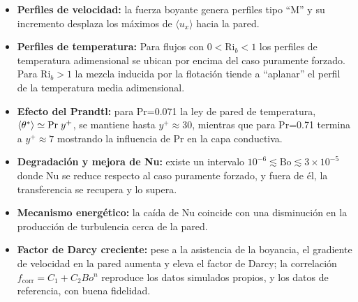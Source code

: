 \begin{itemize}

\item \textbf{Perfiles de velocidad:} la fuerza boyante genera perfiles tipo ``M'' y su incremento desplaza los máximos de $\langle u_x\rangle$ hacia la pared.

\item \textbf{Perfiles de temperatura:} Para flujos con $0 < \text{Ri}_b < 1$ los perfiles de temperatura adimensional se ubican por encima del caso puramente forzado. Para $\text{Ri}_b > 1$  la mezcla inducida por la flotación tiende a ``aplanar'' el perfil de la temperatura media adimensional.

\item \textbf{Efecto del Prandtl:} para Pr=0.071 la ley de pared de temperatura, $\langle\theta^*\rangle \simeq \text{Pr} \hspace{1mm} y^+$, se mantiene hasta $y^+ \approx 30$, mientras que para Pr=0.71 termina a $y^+ \approx 7$ mostrando la influencia de Pr en la capa conductiva.

\item \textbf{Degradación y mejora de Nu:} existe un intervalo $10^{-6} \lesssim \text{Bo} \lesssim 3 \times 10^{-5}$ donde Nu se reduce respecto al caso puramente forzado, y fuera de él, la transferencia se recupera y lo supera.

\item \textbf{Mecanismo energético:} la caída de Nu coincide con una disminución en la producción de turbulencia cerca de la pared.

\item \textbf{Factor de Darcy creciente:} pese a la asistencia de la boyancia, el gradiente de velocidad en la pared aumenta y eleva el factor de Darcy; la correlación $f_{\text{corr}}=C_1+C_2 Bo^n$ reproduce los datos simulados propios, y los datos de referencia, con buena fidelidad.

\end{itemize}

